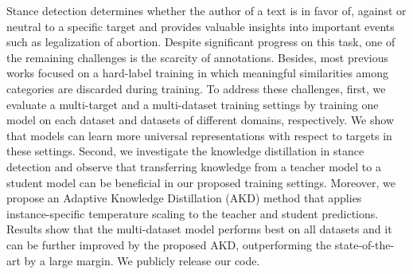 Stance detection determines whether the author of a text is in favor of, against or neutral to a specific target and provides valuable insights into important events such as legalization of abortion. Despite significant progress on this task, one of the remaining challenges is the scarcity of annotations. Besides, most previous works focused on a hard-label training in which meaningful similarities among categories are discarded during training. To address these challenges, first, we evaluate a multi-target and a multi-dataset training settings by training one model on each dataset and datasets of different domains, respectively. We show that models can learn more universal representations with respect to targets in these settings. Second, we investigate the knowledge distillation in stance detection and observe that transferring knowledge from a teacher model to a student model can be beneficial in our proposed training settings. Moreover, we propose an Adaptive Knowledge Distillation (AKD) method that applies instance-specific temperature scaling to the teacher and student predictions. Results show that the multi-dataset model performs best on all datasets and it can be further improved by the proposed AKD, outperforming the state-of-the-art by a large margin. We publicly release our code.
